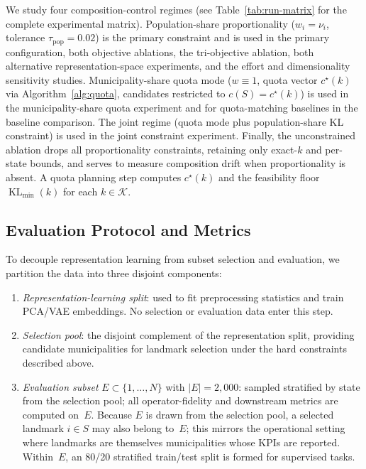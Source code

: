 \documentclass[10pt,journal]{IEEEtran}
\newcommand{\kGrid}{\mathcal{K}}
\newcommand{\1}{\mathbf{1}}
\DeclareMathOperator{\KL}{KL}
\theoremstyle{ieeethm}
\begin{document}
We study four composition-control regimes (see Table~\ref{tab:run-matrix} for the complete experimental matrix). Population-share proportionality ($w_i=\nu_i$, tolerance $\tau_{\mathrm{pop}}=0.02$) is the primary constraint and is used in the primary configuration, both objective ablations, the tri-objective ablation, both alternative representation-space experiments, and the effort and dimensionality sensitivity studies. Municipality-share quota mode ($w\equiv 1$, quota vector $c^\star(k)$ via Algorithm~\ref{alg:quota}, candidates restricted to $c(S)=c^\star(k)$) is used in the municipality-share quota experiment and for quota-matching baselines in the baseline comparison. The joint regime (quota mode plus population-share KL constraint) is used in the joint constraint experiment. Finally, the unconstrained ablation drops all proportionality constraints, retaining only exact-$k$ and per-state bounds, and serves to measure composition drift when proportionality is absent. A quota planning step computes $c^\star(k)$ and the feasibility floor $\KL_{\min}(k)$ for each $k\in\kGrid$.


\subsection{Evaluation Protocol and Metrics}

To decouple representation learning from subset selection and evaluation, we partition the data into three disjoint
components:
\begin{enumerate}
    \item \emph{Representation-learning split}: used to fit preprocessing statistics and train PCA/VAE embeddings. No selection or evaluation data enter this step.
    \item \emph{Selection pool}: the disjoint complement of the representation split, providing candidate municipalities for landmark selection under the hard constraints described above.
    \item \emph{Evaluation subset} $E\subset\{1,\dots,N\}$ with $|E|=2{,}000$: sampled stratified by state from the selection pool; all operator-fidelity and downstream metrics are computed on~$E$. Because $E$ is drawn from the selection pool, a selected landmark $i\in S$ may also belong to~$E$; this mirrors the operational setting where landmarks are themselves municipalities whose KPIs are reported. Within~$E$, an 80/20 stratified train/test split is formed for supervised tasks.
\end{enumerate}
\end{document}
